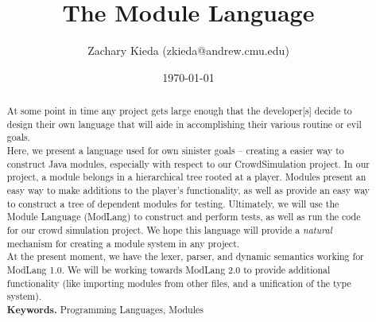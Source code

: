 \documentclass[11pt]{article}
\begin{document}
\title{The Module Language}
\author{Zachary Kieda (zkieda@andrew.cmu.edu)}
\date{\today}
\maketitle
\begin{abstract}
\setlength\parindent{0pt}\noindent 

At some point in time any project gets large enough that the developer[s] decide to design their own language that will aide in accomplishing their various routine or evil goals.\\

Here, we present a language used for own sinister goals -- creating a easier way to construct Java modules, especially with respect to our CrowdSimulation project. In our project, a module belongs in a hierarchical tree rooted at a player. Modules present an easy way to make additions to the player's functionality, as well as provide an easy way to construct a tree of dependent modules for testing. Ultimately, we will use the Module Language (ModLang) to construct and perform tests, as well as run the code for our crowd simulation project. We hope this language will provide a \emph{natural} mechanism for creating a module system in any project.\\

At the present moment, we have the lexer, parser, and dynamic semantics working for ModLang 1.0. We will be working towards ModLang 2.0 to provide additional functionality (like importing modules from other files, and a unification of the type system). \\

\textbf{Keywords.} Programming Languages, Modules
\end{abstract}
\pagebreak
\end{document}
